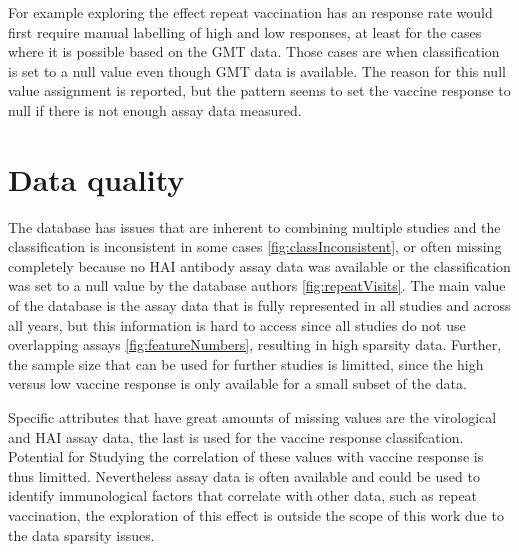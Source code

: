 For example exploring the effect repeat vaccination has an response rate would
first require manual labelling of high and low responses, at least for the
cases where it is possible based on the GMT data. Those cases are when
classification is set to a null value even though GMT data is available.  The
reason for this null value assignment is reported, but the pattern seems to set
the vaccine response to null if there is not enough assay data measured.

\section{Data quality}

The database has issues that are inherent to combining multiple studies and the
classification is inconsistent in some cases \autoref{fig:classInconsistent},
or often missing completely because no HAI antibody assay data was available or
the classification was set to a null value by the database authors
\autoref{fig:repeatVisits}.  The main value of the database is the assay data
that is fully represented in all studies and across all years, but this
information is hard to access since all studies do not use overlapping assays
\autoref{fig:featureNumbers}, resulting in high sparsity data. Further, the
sample size that can be used for further studies is limitted, since the high
versus low vaccine response is only available for a small subset of the data.

Specific attributes that have great amounts of missing values are the
virological and HAI assay data, the last is used for the vaccine response
classifcation. Potential for Studying the correlation of these values with
vaccine response is thus limitted. Nevertheless assay data is often available
and could be used to identify immunological factors that correlate with other
data, such as repeat vaccination, the exploration of this effect is outside the
scope of this work due to the data sparsity issues.

\printbibliography


